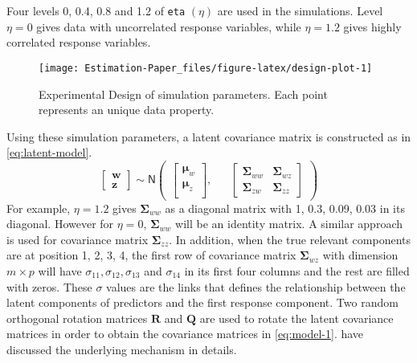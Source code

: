 \documentclass[12pt,3p,authoryear]{elsarticle}
\begin{document}
\begin{description}
Four levels 0, 0.4, 0.8 and 1.2 of \texttt{eta} \((\eta)\) are used in the simulations. Level \(\eta=0\) gives data with uncorrelated response variables, while \(\eta=1.2\) gives highly correlated response variables.
\end{description}

\begin{figure}
\texttt{[image: Estimation-Paper\_files/figure-latex/design-plot-1]} \caption{Experimental Design of simulation parameters. Each point represents an unique data property.}\label{fig:design-plot}
\end{figure}

Using these simulation parameters, a latent covariance matrix is constructed as in \ref{eq:latent-model}.
\begin{equation}
  \begin{bmatrix}
    \mathbf{w} \\ \mathbf{z}
  \end{bmatrix} 
  \sim \mathsf{N}
  \begin{pmatrix}
    \begin{bmatrix}
      \boldsymbol{\mu}_w \\
      \boldsymbol{\mu}_z \\
    \end{bmatrix}, &&
    \begin{bmatrix}
      \boldsymbol{\Sigma}_{ww} & \boldsymbol{\Sigma}_{wz} \\
      \boldsymbol{\Sigma}_{zw} & \boldsymbol{\Sigma}_{zz} 
    \end{bmatrix}
  \end{pmatrix}
  \label{eq:latent-model}
\end{equation}
For example, \(\eta=1.2\) gives \(\boldsymbol{\Sigma}_{ww}\) as a diagonal matrix with 1, 0.3, 0.09, 0.03 in its diagonal. However for \(\eta=0\), \(\boldsymbol{\Sigma}_{ww}\) will be an identity matrix. A similar approach is used for covariance matrix \(\boldsymbol{\Sigma}_{zz}\). In addition, when the true relevant components are at position 1, 2, 3, 4, the first row of covariance matrix \(\boldsymbol{\Sigma}_{wz}\) with dimension \(m \times p\) will have \(\sigma_{11}, \sigma_{12}, \sigma_{13}\) and \(\sigma_{14}\) in its first four columns and the rest are filled with zeros. These \(\sigma\) values are the links that defines the relationship between the latent components of predictors and the first response component. Two random orthogonal rotation matrices \(\mathbf{R}\) and \(\mathbf{Q}\) are used to rotate the latent covariance matrices in order to obtain the covariance matrices in \ref{eq:model-1}. \citet{Rimal2018} have discussed the underlying mechanism in details.
\end{document}
